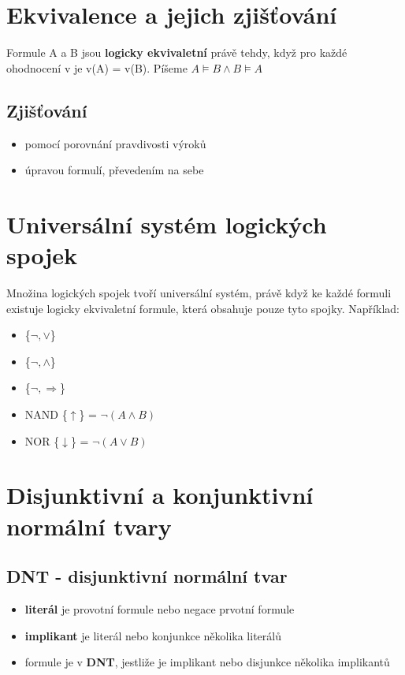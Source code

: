 \documentclass{szzclass}
\begin{document}
\section{Ekvivalence a jejich zjišťování}
Formule A a B jsou \textbf{logicky ekvivaletní} právě tehdy, když pro každé ohodnocení v je v(A) = v(B). Píšeme $A \models B \wedge B \models A$

\subsection{Zjišťování}
\begin{itemize}
	\item pomocí porovnání pravdivosti výroků
	\item úpravou formulí, převedením na sebe
\end{itemize}
\section{Universální systém logických spojek}
Množina logických spojek tvoří universální systém, právě když ke každé formuli existuje logicky ekvivaletní formule, která obsahuje pouze
tyto spojky. Například:
\begin{itemize}
	\item \{$\neg, \vee$\}
	\item \{$\neg, \wedge $\}
	\item \{$\neg, \Rightarrow$\}
	\item NAND \{$\uparrow$\} = $\neg(A \wedge B)$
	\item NOR \{$\downarrow$\} = $\neg(A \vee B)$
\end{itemize}
\section{Disjunktivní a konjunktivní normální tvary}
\subsection{DNT - disjunktivní normální tvar}
\begin{itemize}
	\item \textbf{literál} je provotní formule nebo negace prvotní formule
	\item \textbf{implikant} je literál nebo konjunkce několika literálů
	\item formule je v \textbf{DNT}, jestliže je implikant nebo disjunkce několika implikantů 
\end{itemize}
\end{document}
